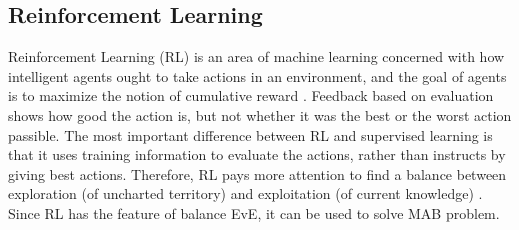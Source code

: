 \documentclass[journal]{IEEEtran}
\begin{document}
\subsection{Reinforcement Learning}
Reinforcement Learning (RL) \cite{sutton2018reinforcement} is an area of machine learning concerned with how intelligent agents ought to take actions in an environment, and the goal of agents is to maximize the notion of cumulative reward \cite{van2012reinforcement}.
Feedback based on evaluation shows how good the action is, but not whether it was the best or the worst action passible.
The most important difference between RL and supervised learning is that it uses training information to evaluate the actions, rather than instructs by giving best actions.
Therefore, RL pays more attention to find a balance between exploration (of uncharted territory) and exploitation (of current knowledge) \cite{kaelbling1996reinforcement}.
Since RL has the feature of balance EvE, it can be used to solve MAB problem.
\end{document}
